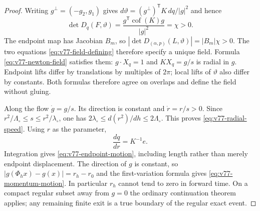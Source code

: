 \begin{proof}
Writing $g^\perp=(-g_2,g_1)$ gives
$d\vartheta=(g^\perp)^{\mathsf T}K\,dq/|g|^2$ and hence
\begin{equation}\label{eq:v77-jacobian}
       \det D_q(F,\vartheta)=\frac{g^{\mathsf T}
                   \operatorname{cof}(K)g}{|g|^2}=\chi>0.
\end{equation}
The endpoint map has Jacobian $B_m$, so
$|\det D_{(\alpha,p)}(L,\vartheta)|=|B_m|\chi>0$.
The two equations \eqref{eq:v77-field-defining} therefore specify a
unique field. Formula \eqref{eq:v77-newton-field} satisfies them:
$g\cdot X_q=1$ and $KX_q=g/s$ is radial in $g$.
Endpoint lifts differ by translations by multiples of $2\pi$;
local lifts of $\vartheta$ also differ by constants. Both formulas
therefore agree on overlaps and define the field without gluing.

Along the flow $\dot g=g/s$. Its direction is constant and
$\dot r=r/s>0$. Since
$r^2/\Lambda_\circ\le s\le r^2/\lambda_\circ$,
one has $2\lambda_\circ\le d(r^2)/dh\le2\Lambda_\circ$.
This proves \eqref{eq:v77-radial-speed}. Using $r$ as the parameter,
\[
                     \frac{dq}{dr}=K^{-1}e.
\]
Integration gives \eqref{eq:v77-endpoint-motion}, including length
rather than merely endpoint displacement. The direction of $g$ is
constant, so $|g(\Phi_hx)-g(x)|=r_h-r_0$ and the first-variation
formula gives \eqref{eq:v77-momentum-motion}. In particular $r_h$
cannot tend to zero in forward time. On a compact regular subset
away from $g=0$ the ordinary continuation theorem applies; any
remaining finite exit is a true boundary of the regular exact event.
\end{proof}

